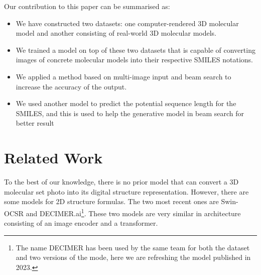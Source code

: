 \documentclass[conference]{IEEEtran}
\begin{document}
Our contribution to this paper can be summarised as:
\begin{itemize}
\item We have constructed two datasets: one computer-rendered 3D molecular model and another consisting of real-world 3D molecular models.
\item We trained a model on top of these two datasets that is capable of converting images of concrete molecular models into their respective SMILES notations. 
\item We applied a method based on multi-image input and beam search to increase the accuracy of the output.
\item We used another model to predict the potential sequence length for the SMILES, and this is used to help the generative model in beam search for better result
\end{itemize}

\section{Related Work}
To the best of our knowledge, there is no prior model that can convert a 3D molecular set photo into its digital structure representation. However, there are some models for 2D structure formulas. The two most recent ones are Swin-OCSR\cite{swinocsr} and DECIMER.ai\footnote{The name DECIMER has been used by the same team for both the dataset and two versions of the mode, here we are refreshing the model published in 2023.}\cite{decimer}. These two models are very similar in architecture consisting of an image encoder and a transformer.

\end{document}
